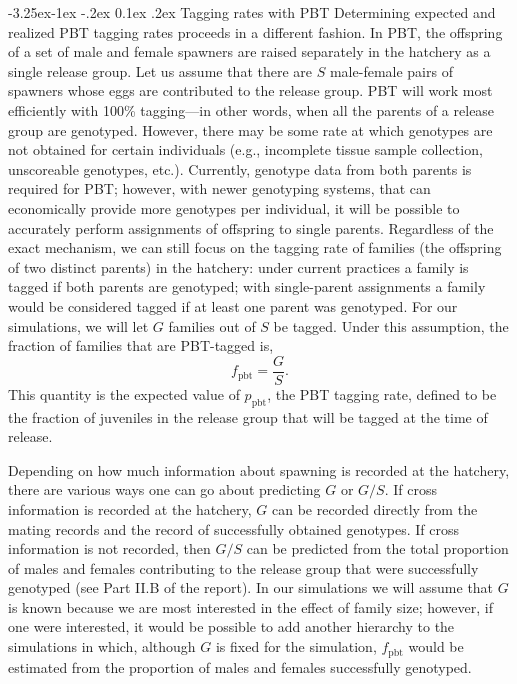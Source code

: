 \documentclass[11pt]{article}
\makeatletter
\renewcommand\subsection{\@startsection{subsection}{2}{\z@}%
                                     {-3.25ex\@plus -1ex \@minus -.2ex}%
                                     {0.1ex \@plus .2ex}%
                                     {\normalfont\normalsize\bfseries}}
\makeatother
\begin{document}
\subsection{Tagging rates with PBT}
Determining expected and realized PBT tagging rates proceeds in a different fashion.  In PBT, the
offspring of a set of male and female spawners are raised separately in the hatchery
as a single release group. Let us assume that there are $S$ male-female pairs of spawners
whose eggs are contributed to the release group.  PBT will work most
efficiently with 100\% tagging---in other words, when all the parents of a release group
are genotyped.  However, there may be some rate at which genotypes are not obtained for certain
individuals (e.g., incomplete tissue sample collection, unscoreable genotypes, etc.).  Currently,
genotype data from both parents is  required for PBT; however, with newer genotyping
systems, that can economically provide more genotypes per individual, it will be possible
to accurately perform assignments of offspring to single parents.  Regardless of the exact mechanism,
we can still focus on the tagging rate of families (the offspring of two distinct parents) in the hatchery: under current practices
a family is tagged if both parents are genotyped; with single-parent assignments a family would be
considered tagged if at least one parent was genotyped.  For our 
simulations, we will let $G$ families out of $S$ be tagged.
Under this assumption, the
fraction of families that are PBT-tagged is,
\[
f_\mathrm{pbt} = \frac{G}{S}.
\]   
This quantity is the expected value of $p_\mathrm{pbt}$, the PBT tagging rate, defined to be the
fraction of juveniles in the release group that will be tagged at the time
of release.

 
  
Depending on how much information about spawning is recorded at the hatchery, there are various
ways one can go about predicting $G$ or $G/S$. 
If cross information is recorded at the
hatchery, $G$ can be recorded directly from the mating records and the record of successfully obtained genotypes.
If cross information is not recorded, then $G/S$ can be predicted from the total proportion of males and 
females contributing to the release group that were successfully genotyped (see Part II.B of the report).
In our simulations we will assume that $G$ is known because we are most interested in the effect of family
size;  however, if one were interested, it would be possible to add another hierarchy to the simulations in which,
although $G$ is fixed for the simulation,  $f_\mathrm{pbt}$ would be estimated from the proportion of males
and females successfully genotyped.
\end{document}
